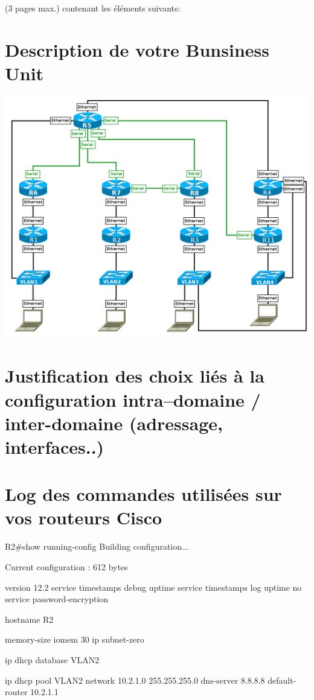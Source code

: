 \documentclass{article}
\author{Benjamain André\\Alexis Lecocp\\Arnaud Collin\\Waelkens Dimitri}
\begin{document}
\Rapport (3 pages max.) contenant les éléments suivants:

\section{Description de votre Bunsiness Unit}

\includegraphics[scale=0.2]{image.png}

\section{Justification des choix liés à la configuration intra--domaine / inter-domaine (adressage, interfaces..)}

\section{Log des commandes utilisées sur vos routeurs Cisco}

R2#show running-config
Building configuration...

Current configuration : 612 bytes

version 12.2
service timestamps debug uptime
service timestamps log uptime
no service password-encryption

hostname R2

memory-size iomem 30
ip subnet-zero

ip dhcp database VLAN2

ip dhcp pool VLAN2
   network 10.2.1.0 255.255.255.0
   dns-server 8.8.8.8
   default-router 10.2.1.1
\end{document}
